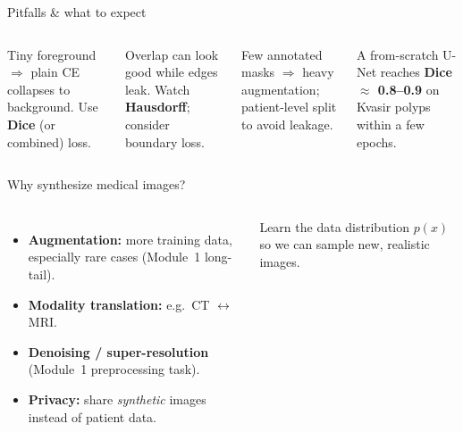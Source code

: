\documentclass[
11pt,notheorems,hyperref={pdfauthor=whatever}
]{beamer}
\begin{document}
\begin{frame}{Pitfalls \& what to expect}
\small
\begin{columns}[T,onlytextwidth]
    \begin{tcolorbox}[medicalglass, title=\textbf{\color{accCoral}Class imbalance}]
    Tiny foreground $\Rightarrow$ plain CE collapses to background. Use \textbf{Dice}
    (or combined) loss.
    \end{tcolorbox}
    \begin{tcolorbox}[medicalglass, title=\textbf{\color{accAmber}Boundaries}]
    Overlap can look good while edges leak. Watch \textbf{Hausdorff}; consider boundary
    loss.
    \end{tcolorbox}

    \begin{tcolorbox}[medicalglass, title=\textbf{\color{accTeal}Small data}]
    Few annotated masks $\Rightarrow$ heavy augmentation; patient-level split to avoid
    leakage.
    \end{tcolorbox}
    \begin{tcolorbox}[medicalglass, title=\textbf{\color{accGreen}Expect}]
    A from-scratch U-Net reaches \textbf{Dice $\approx$ 0.8--0.9} on Kvasir polyps within
    a few epochs.
    \end{tcolorbox}
\end{columns}
\end{frame}



\begin{frame}{Why synthesize medical images?}
\small
\begin{columns}[T,onlytextwidth]
    \begin{itemize}\setlength\itemsep{0.5em}
        \item \textbf{Augmentation:} more training data, especially \alert{rare cases}
              (Module~1 long-tail).
        \item \textbf{Modality translation:} e.g.\ CT $\leftrightarrow$ MRI.
        \item \textbf{Denoising / super-resolution} (Module~1 preprocessing task).
        \item \textbf{Privacy:} share \emph{synthetic} images instead of patient data.
    \end{itemize}
    \begin{tcolorbox}[medicalglass, title=\textbf{\color{accAmber}Goal}]
    Learn the data distribution $p(x)$ so we can \alert{sample} new, realistic images.
    \end{tcolorbox}
\end{columns}
\end{frame}
\end{document}
